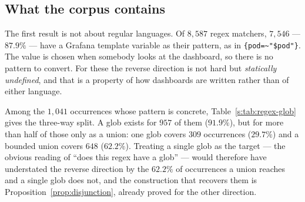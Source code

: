 \subsection{What the corpus contains}
\label{s:sec:glob-corpus}

\begin{table}[htbp]\centering\footnotesize

\caption{Every \texttt{=\textasciitilde{}} and \texttt{!\textasciitilde{}} matcher in the
PromQL half of the corpus. Shares are of the concrete regular expressions; the
template-valued row is counted but not classified, because the pattern is not in the query
text.}
\label{s:tab:regex-glob}
\end{table}

The first result is not about regular languages. Of $8{,}587$ regex matchers, $7{,}546$
--- $87.9\%$ --- have a Grafana template variable as their pattern, as in
\texttt{\{pod=\textasciitilde{}"\$pod"\}}. The value is chosen when somebody looks at the
dashboard, so there is no pattern to convert. For these the reverse direction is not hard
but \emph{statically undefined}, and that is a property of how dashboards are written
rather than of either language.

Among the $1{,}041$ occurrences whose pattern is concrete,
Table~\ref{s:tab:regex-glob} gives the three-way split. A glob exists for $957$ of them
($91.9\%$), but for more than half of those only as a union: one glob covers $309$
occurrences ($29.7\%$) and a bounded union covers $648$ ($62.2\%$). Treating a single glob
as the target --- the obvious reading of ``does this regex have a glob'' --- would
therefore have understated the reverse direction by the $62.2\%$ of occurrences a union
reaches and a single glob does not, and the construction that recovers them is
Proposition~\ref{prop:disjunction}, already proved for the other direction.

\begin{table}[htbp]\centering\footnotesize

\caption{The constructs behind the $84$ refused occurrences. The first is ruled out as a
single glob by Corollary~\ref{cor:no-glob} and the second by
Corollary~\ref{cor:absent-char}; only the second is also beyond a bounded union of globs.}
\label{s:tab:regex-glob-reasons}
\end{table}

\begin{table}[htbp]\centering\footnotesize

\caption{Worked cases, most frequent first: the PromQL pattern, the Datadog scope value
the reverse translation produces, and how many occurrences carry it. A $\bot$ row names
the reason rather than a scope. \texttt{LIST|GET} is the case of
\S\ref{s:sec:glob-corpus}'s closing paragraph on case folding: the scope is an exact
translation of the pattern and matches nothing in any Datadog database.}
\label{s:tab:regex-glob-examples}
\end{table}

